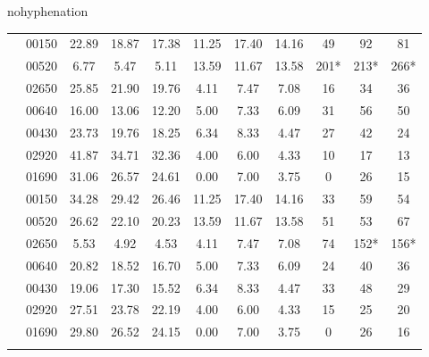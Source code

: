 \begin{hyphenrules}{nohyphenation}
\begin{table}[H]
{\begin{tabular}{>{\raggedleft\arraybackslash}p{4cm} lccCccCccc}
             & 00150 & 22.89 & 18.87 & 17.38 & 11.25 & 17.40 & 14.16 & 49 & 92 & 81 \\
            & 00520 &                       6.77 & 5.47 & 5.11 &        13.59 & 11.67 & 13.58 & 201* & 213* & 266* \\
            & 02650 &                       25.85 & 21.90 & 19.76 &     4.11 & 7.47 & 7.08 &    16 & 34 & 36 \\
            & 00640 &                       16.00 & 13.06 & 12.20 &     5.00 & 7.33 & 6.09 &    31 & 56 & 50 \\
            & 00430 &                       23.73 & 19.76 & 18.25 &     6.34 & 8.33 & 4.47 &    27 & 42 & 24 \\
            & 02920 &                       41.87 & 34.71 & 32.36 &     4.00 & 6.00 & 4.33 &    10 & 17 & 13 \\
            & 01690 &                       31.06 & 26.57 & 24.61 &     0.00 & 7.00 & 3.75 &    0 & 26 & 15 \\
            \midrule
            
             & 00150 & 34.28 & 29.42 & 26.46 & 11.25 & 17.40 & 14.16 & 33 & 59 & 54 \\
            & 00520 &                       26.62 & 22.10 & 20.23 &     13.59 & 11.67 & 13.58 & 51 & 53 & 67 \\
            & 02650 &                       5.53 & 4.92 & 4.53 &        4.11 & 7.47 & 7.08 &    74 & 152* & 156* \\
            & 00640 &                       20.82 & 18.52 & 16.70 &     5.00 & 7.33 & 6.09 &    24 & 40 & 36 \\
            & 00430 &                       19.06 & 17.30 & 15.52 &     6.34 & 8.33 & 4.47 &    33 & 48 & 29 \\
            & 02920 &                       27.51 & 23.78 & 22.19 &     4.00 & 6.00 & 4.33 &    15 & 25 & 20 \\
            & 01690 &                       29.80 & 26.52 & 24.15 &     0.00 & 7.00 & 3.75 &    0 & 26 & 16 \\
            \midrule
            

\end{tabular}}
\end{table}
\end{hyphenrules}

